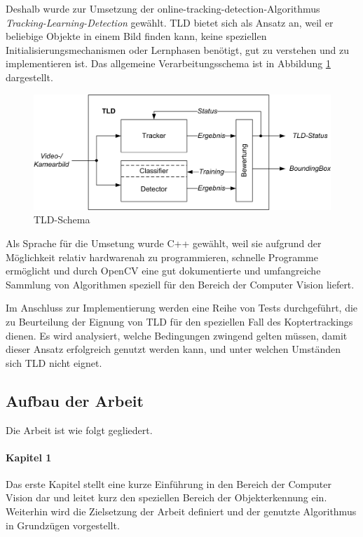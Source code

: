 Deshalb wurde zur Umsetzung der online-tracking-detection-Algorithmus \textit{Tracking-Learning-Detection} \cite{TLD} gewählt. TLD bietet sich als Ansatz an, weil er beliebige Objekte in einem Bild finden kann, keine speziellen Initialisierungsmechanismen oder Lernphasen benötigt, gut zu verstehen und zu implementieren ist. Das allgemeine Verarbeitungsschema ist in Abbildung \ref{TLD-Schema} dargestellt.

\begin{figure}
\centering{}\includegraphics[scale=0.75]{../pictures/TLD-Framework.jpg}\caption{TLD-Schema}
\label{TLD-Schema}
\end{figure}

Als Sprache für die Umsetung wurde C++ gewählt, weil sie aufgrund der Möglichkeit relativ hardwarenah zu programmieren, schnelle Programme ermöglicht und durch OpenCV \cite{OCV} eine gut dokumentierte und umfangreiche Sammlung von Algorithmen speziell für den Bereich der Computer Vision liefert.

Im Anschluss zur Implementierung werden eine Reihe von Tests durchgeführt, die zu Beurteilung der Eignung von TLD für den speziellen Fall des Koptertrackings dienen. Es wird analysiert, welche Bedingungen zwingend gelten müssen, damit dieser Ansatz erfolgreich genutzt werden kann, und unter welchen Umständen sich TLD nicht eignet.


\subsection{Aufbau der Arbeit}
Die Arbeit ist wie folgt gegliedert.

\paragraph{Kapitel 1}
Das erste Kapitel stellt eine kurze Einführung in den Bereich der Computer Vision dar und leitet kurz den speziellen Bereich der Objekterkennung ein. Weiterhin wird die Zielsetzung der Arbeit definiert und der genutzte Algorithmus in Grundzügen vorgestellt.

